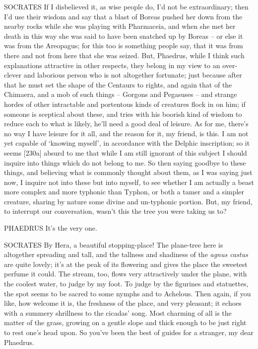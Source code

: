 SOCRATES If I disbelieved it, as wise
people do, I'd not be
extraordinary; then I'd use their wisdom and say that a blast of Boreas
pushed her down from the nearby rocks while she was playing with
Pharmaceia, and when she met her death in this  way she was said
to have been snatched up by Boreas -- or else it was from the Areopagus;
for this too is something people say, that it was from there and not
from here that she was seized. But, Phaedrus, while I think such
explanations attractive in other respects, they belong in my view to an
over-clever and  laborious person who is not altogether
fortunate; just because after that he must set the shape of the Centaurs
to rights, and again that of the Chimaera, and a mob of such things --
Gorgons  and Pegasuses -- and strange hordes of other
intractable and portentous kinds of creatures flock in on him; if
someone is sceptical about these, and tries with his boorish kind of
wisdom to reduce each to what is likely, he'll need a good deal of
leisure.  As for me, there's no way I have leisure for it all,
and the reason for it, my friend, is this. I am not yet capable of
‘knowing myself', in accordance with the Delphic
inscription; so it seems
{[}230a{]} absurd to me that while I am still ignorant of this subject I
should inquire into things which do not belong to me. So then saying
goodbye to these things, and believing what is commonly thought about
them, as I was saying just now, I inquire not into these but into
myself, to see whether I am actually a beast  more complex and
more typhonic than
Typhon, or both a tamer
and a simpler creature, sharing by nature some divine and un-typhonic
portion. But, my friend, to interrupt our
conversation, wasn't this
the tree you were taking us to?

 PHAEDRUS It's the very one.

SOCRATES By Hera, a beautiful
stopping-place! The
plane-tree here is altogether spreading and tall, and the tallness and
shadiness of the {\em agnus
castus} are quite lovely;
it's at the peak  of its flowering and gives the place the
sweetest perfume it could. The stream, too, flows very attractively
under the plane, with the coolest water, to judge by my foot. To judge
by the figurines and statuettes, the spot seems to be sacred to some
 nymphs and to
Achelous. Then again, if
you like, how welcome it is, the freshness of the place, and very
pleasant; it echoes with a summery shrillness to the cicadas' song. Most
charming of all is the matter of the grass, growing on a gentle slope
and thick enough to be just right to rest one's head upon. So you've
 been the best of guides for a stranger, my dear Phaedrus.

